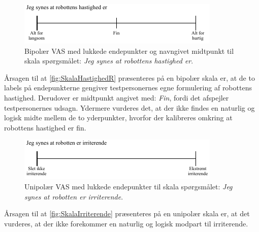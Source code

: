 %
\begin{figure}[H]
\centering
\includegraphics[width =\textwidth]{Figure/UdvalgteSkalaer/HastighedR} 
\caption{Bipolær VAS med lukkede endepunkter og navngivet midtpunkt til skala spørgsmålet: \textit{Jeg synes at robottens hastighed er}.}
\label{fig:SkalaHastighedR}
\end{figure}
\noindent
%
Årsagen til at \autoref{fig:SkalaHastighedR} præsenteres på en bipolær skala er, at de to labels på endepunkterne gengiver testpersonernes egne formulering af robottens hastighed. Derudover er midtpunkt angivet med: \textit{Fin}, fordi det afspejler testpersonernes udsagn. Ydermere vurderes det, at der ikke findes en naturlig og logisk midte mellem de to yderpunkter, hvorfor der kalibreres omkring at robottens hastighed er fin. 
%
\begin{figure}[H]
\centering
\includegraphics[width =\textwidth]{Figure/UdvalgteSkalaer/Irriterende} 
\caption{Unipolær VAS med lukkede endepunkter til skala spørgsmålet: \textit{Jeg synes at robotten er irriterende}.}
\label{fig:SkalaIrriterende}
\end{figure}
\noindent
%
Årsagen til at \autoref{fig:SkalaIrriterende} præsenteres på en unipolær skala er, at det vurderes, at der ikke forekommer en naturlig og logisk modpart til irriterende.

